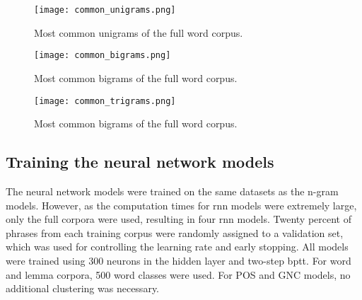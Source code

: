 \begin{figure}[!htbp]
	  \centering
	  \texttt{[image: common\_unigrams.png]}
	      \caption{Most common unigrams of the full word corpus.}
	      \label{figure:commonunigrams}
\end{figure}

\begin{figure}[!htbp]
	  \centering
	  \texttt{[image: common\_bigrams.png]}
	      \caption{Most common bigrams of the full word corpus.}
	      \label{figure:commonbigrams}
\end{figure}

\begin{figure}[!htbp]
	  \centering
	  \texttt{[image: common\_trigrams.png]}
	      \caption{Most common bigrams of the full word corpus.}
	      \label{figure:commontrigrams}
\end{figure}

\FloatBarrier
\subsection{Training the neural network models}
The neural network models were trained on the same datasets as the n-gram models. However, as the computation times for \gls{rnn} models were extremely large, only the full corpora were used, resulting in four \gls{rnn} models. Twenty percent of phrases from each training corpus were randomly assigned to a validation set, which was used for controlling the learning rate and early stopping. All models were trained using 300 neurons in the hidden layer and two-step \gls{bptt}. For word and lemma corpora, 500 word classes were used. For POS and GNC models, no additional clustering was necessary.
